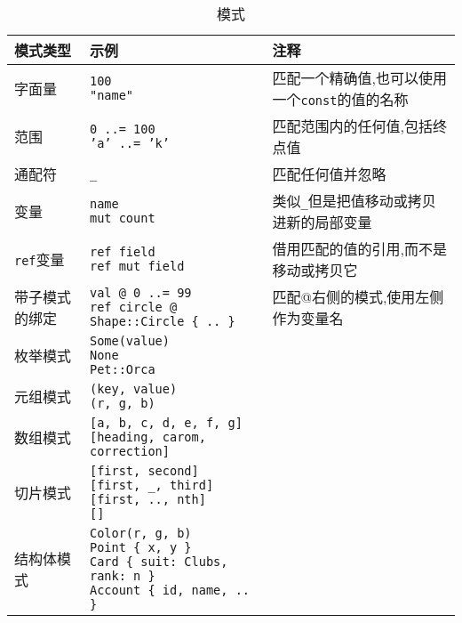 \begin{table}[htbp]
    \centering
    \caption{模式}
    \label{t10-1}
    \begin{tabular}{p{}p{}p{}}
        \hline
        \textbf{模式类型} & \textbf{示例} & \textbf{注释} \\
        \hline
        字面量  & \makecell[l]{\texttt{100} \\ \texttt{"name"}} & 匹配一个精确值,也可以使用一个\texttt{const}的值的名称    \\
        \rowcolor{tablecolor}
        范围    & \makecell[l]{\texttt{0 ..= 100} \\ \texttt{'a' ..= 'k'}}  & 匹配范围内的任何值,包括终点值 \\
        通配符  & \texttt{\_}   & 匹配任何值并忽略  \\
        \rowcolor{tablecolor}
        变量    & \makecell[l]{\texttt{name} \\ \texttt{mut count}} & 类似\texttt{\_}但是把值移动或拷贝进新的局部变量   \\
        \texttt{ref}变量    & \makecell[l]{\texttt{ref field} \\ \texttt{ref mut field}}    & 借用匹配的值的引用,而不是移动或拷贝它    \\
        \rowcolor{tablecolor}
        带子模式的绑定  & \makecell[l]{\texttt{val @ 0 ..= 99} \\ \texttt{ref circle @ Shape::Circle \{ .. \}}} & 匹配@右侧的模式,使用左侧作为变量名   \\
        枚举模式    & \makecell[l]{\texttt{Some(value)} \\ \texttt{None} \\ \texttt{Pet::Orca}} & \\
        \rowcolor{tablecolor}
        元组模式    & \makecell[l]{\texttt{(key, value)} \\ \texttt{(r, g, b)}} & \\
        数组模式    & \makecell[l]{\texttt{[a, b, c, d, e, f, g]} \\ \texttt{[heading, carom, correction]}} & \\
        \rowcolor{tablecolor}
        切片模式    & \makecell[l]{\texttt{[first, second]} \\ \texttt{[first, \_, third]} \\ \texttt{[first, .., nth]} \\ \texttt{[]}}  & \\
        结构体模式  & \makecell[l]{\texttt{Color(r, g, b)} \\ \texttt{Point \{ x, y \}} \\ \texttt{Card \{ suit: Clubs, rank: n \}} \\ \texttt{Account \{ id, name, .. \}}} & \\

\end{tabular}
\end{table}
